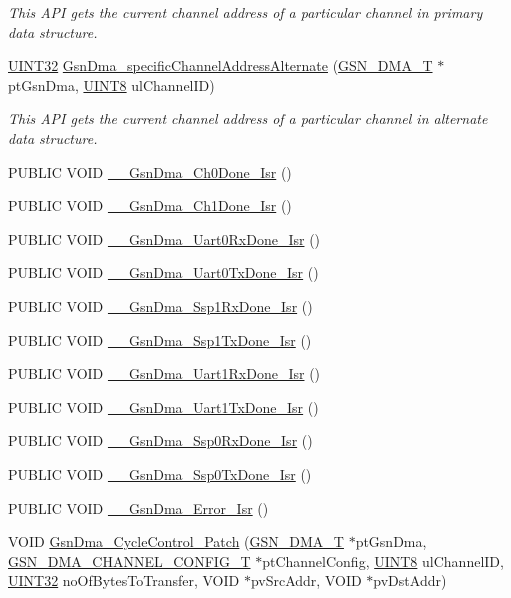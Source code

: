 \begin{DoxyCompactItemize}
\begin{DoxyCompactList}\small\item\em This API gets the current channel address of a particular channel in primary data structure. \end{DoxyCompactList}\item 
\hyperlink{a00660_gae1e6edbbc26d6fbc71a90190d0266018}{UINT32} \hyperlink{a00645_ga9fcb9e0aa7d752da1a090711fbff8a3d}{GsnDma\_\-specificChannelAddressAlternate} (\hyperlink{a00049}{GSN\_\-DMA\_\-T} $\ast$ptGsnDma, \hyperlink{a00660_gab27e9918b538ce9d8ca692479b375b6a}{UINT8} ulChannelID)
\begin{DoxyCompactList}\small\item\em This API gets the current channel address of a particular channel in alternate data structure. \end{DoxyCompactList}\item 
PUBLIC VOID \hyperlink{a00484_a2db75948eb583e75e11f4ac287b2766e}{\_\-\_\-GsnDma\_\-Ch0Done\_\-Isr} ()
\item 
PUBLIC VOID \hyperlink{a00484_ae217e6a6691be2dd27086c30d67026de}{\_\-\_\-GsnDma\_\-Ch1Done\_\-Isr} ()
\item 
PUBLIC VOID \hyperlink{a00484_a8be43228692851af8402e56e581c5e72}{\_\-\_\-GsnDma\_\-Uart0RxDone\_\-Isr} ()
\item 
PUBLIC VOID \hyperlink{a00484_af606698daa414a28662039ea4f85aa60}{\_\-\_\-GsnDma\_\-Uart0TxDone\_\-Isr} ()
\item 
PUBLIC VOID \hyperlink{a00484_aa996fcc9d38535a53101a433127a3960}{\_\-\_\-GsnDma\_\-Ssp1RxDone\_\-Isr} ()
\item 
PUBLIC VOID \hyperlink{a00484_a80f90818e028689f83ac68475f99260d}{\_\-\_\-GsnDma\_\-Ssp1TxDone\_\-Isr} ()
\item 
PUBLIC VOID \hyperlink{a00484_a6cd5419759533b469376a5a0981451a8}{\_\-\_\-GsnDma\_\-Uart1RxDone\_\-Isr} ()
\item 
PUBLIC VOID \hyperlink{a00484_a665c71acdcac9cc68e7613af8b04688b}{\_\-\_\-GsnDma\_\-Uart1TxDone\_\-Isr} ()
\item 
PUBLIC VOID \hyperlink{a00484_a7806ddf28965bbbb91adbd4a168393a8}{\_\-\_\-GsnDma\_\-Ssp0RxDone\_\-Isr} ()
\item 
PUBLIC VOID \hyperlink{a00484_a355b1c6f973ea9385a5391e6f830e01c}{\_\-\_\-GsnDma\_\-Ssp0TxDone\_\-Isr} ()
\item 
PUBLIC VOID \hyperlink{a00484_a0f19f6fb93100fbb11c6dc1abc5c88ee}{\_\-\_\-GsnDma\_\-Error\_\-Isr} ()
\item 
VOID \hyperlink{a00484_adb0f53073632fcf7c5c096f1d941226e}{GsnDma\_\-CycleControl\_\-Patch} (\hyperlink{a00049}{GSN\_\-DMA\_\-T} $\ast$ptGsnDma, \hyperlink{a00052}{GSN\_\-DMA\_\-CHANNEL\_\-CONFIG\_\-T} $\ast$ptChannelConfig, \hyperlink{a00660_gab27e9918b538ce9d8ca692479b375b6a}{UINT8} ulChannelID, \hyperlink{a00660_gae1e6edbbc26d6fbc71a90190d0266018}{UINT32} noOfBytesToTransfer, VOID $\ast$pvSrcAddr, VOID $\ast$pvDstAddr)

\end{DoxyCompactItemize}
